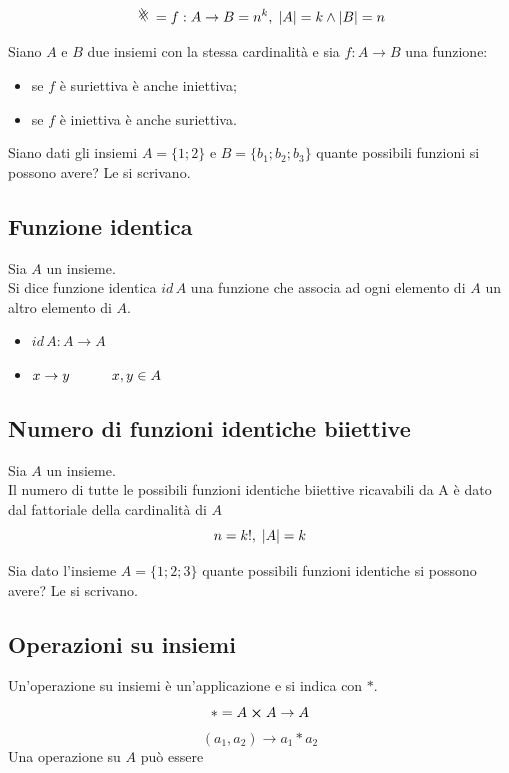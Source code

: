 \begin{flushleft}
\[\rotatebox{45}{\#} = f:A\to B = n^k,\;\abs{A} = k\land\abs{B} = n\]

Siano $A$ e $B$ due insiemi con la stessa cardinalità e sia $f:A\to B$ una funzione:
\begin{itemize}
    \item se $f$ è suriettiva è anche iniettiva;
    \item se $f$ è iniettiva è anche suriettiva.
\end{itemize}
\begin{esercizio}
Siano dati gli insiemi $A=\{1;2\}$ e $B=\{b_1; b_2;b_3\}$ quante possibili funzioni si possono avere? Le si scrivano.
\end{esercizio}
\vspace{200px}



\subsection{Funzione identica}
Sia $A$ un insieme.\\
Si dice funzione identica $id\,A$ una funzione che associa ad ogni elemento di $A$ un altro elemento di $A$.
\begin{itemize}
    \item $id\,A:A\to A$
    \item $x\to y\hspace{30px} x,y\in A$
\end{itemize}

\subsection{Numero di funzioni identiche biiettive}
Sia $A$ un insieme.\\
Il numero di tutte le possibili funzioni identiche biiettive ricavabili da A è dato dal fattoriale della cardinalità di $A$
\[n=k!,\;\abs{A}  = k\]
\begin{esercizio}
Sia dato l'insieme $A=\{1;2;3\}$ quante possibili funzioni identiche si possono avere? Le si scrivano.
\end{esercizio}
\vspace{200px}

\subsection{Operazioni su insiemi}
Un'operazione su insiemi è un'applicazione e si indica con $\ast$.\\
\[\ast = A\cross A \to A\]
\[(a_1, a_2) \to a_1 \ast a_2\]
Una operazione su $A$ può essere

\end{flushleft}
